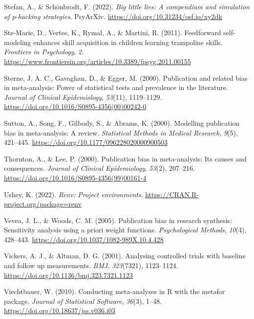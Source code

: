 \documentclass[
  man, donotrepeattitle,floatsintext]{apa7}
\newlength{\cslhangindent}
\newlength{\cslentryspacingunit} %
\newenvironment{CSLReferences}[2] %
 {%
  \setlength{\parindent}{0pt}
  \ifodd #1
  \let\oldpar\par
  \def\par{\hangindent=\cslhangindent\oldpar}
  \fi
  \setlength{\parskip}{#2\cslentryspacingunit}
 }%
 {}
\begin{document}
\begin{CSLReferences}{1}{0}
\leavevmode{}%
Stefan, A., \& Schönbrodt, F. (2022). \emph{Big little lies: A compendium and simulation of p-hacking strategies}. {PsyArXiv}. \url{https://doi.org/10.31234/osf.io/xy2dk}

\leavevmode{}%
Ste-Marie, D., Vertes, K., Rymal, A., \& Martini, R. (2011). Feedforward self-modeling enhances skill acquisition in children learning trampoline skills. \emph{Frontiers in Psychology}, \emph{2}. \url{https://www.frontiersin.org/articles/10.3389/fpsyg.2011.00155}

\leavevmode{}%
Sterne, J. A. C., Gavaghan, D., \& Egger, M. (2000). Publication and related bias in meta-analysis: Power of statistical tests and prevalence in the literature. \emph{Journal of Clinical Epidemiology}, \emph{53}(11), 1119--1129. \url{https://doi.org/10.1016/S0895-4356(00)00242-0}

\leavevmode{}%
Sutton, A., Song, F., Gilbody, S., \& Abrams, K. (2000). Modelling publication bias in meta-analysis: A review. \emph{Statistical Methods in Medical Research}, \emph{9}(5), 421--445. \url{https://doi.org/10.1177/096228020000900503}

\leavevmode{}%
Thornton, A., \& Lee, P. (2000). Publication bias in meta-analysis: Its causes and consequences. \emph{Journal of Clinical Epidemiology}, \emph{53}(2), 207--216. \url{https://doi.org/10.1016/S0895-4356(99)00161-4}

\leavevmode{}%
Ushey, K. (2022). \emph{Renv: Project environments}. \url{https://CRAN.R-project.org/package=renv}

\leavevmode{}%
Vevea, J. L., \& Woods, C. M. (2005). Publication bias in research synthesis: Sensitivity analysis using a priori weight functions. \emph{Psychological Methods}, \emph{10}(4), 428--443. \url{https://doi.org/10.1037/1082-989X.10.4.428}

\leavevmode{}%
Vickers, A. J., \& Altman, D. G. (2001). Analysing controlled trials with baseline and follow up measurements. \emph{BMJ}, \emph{323}(7321), 1123--1124. \url{https://doi.org/10.1136/bmj.323.7321.1123}

\leavevmode{}%
Viechtbauer, W. (2010). Conducting meta-analyses in {R} with the {metafor} package. \emph{Journal of Statistical Software}, \emph{36}(3), 1--48. \url{https://doi.org/10.18637/jss.v036.i03}


\end{CSLReferences}
\end{document}
